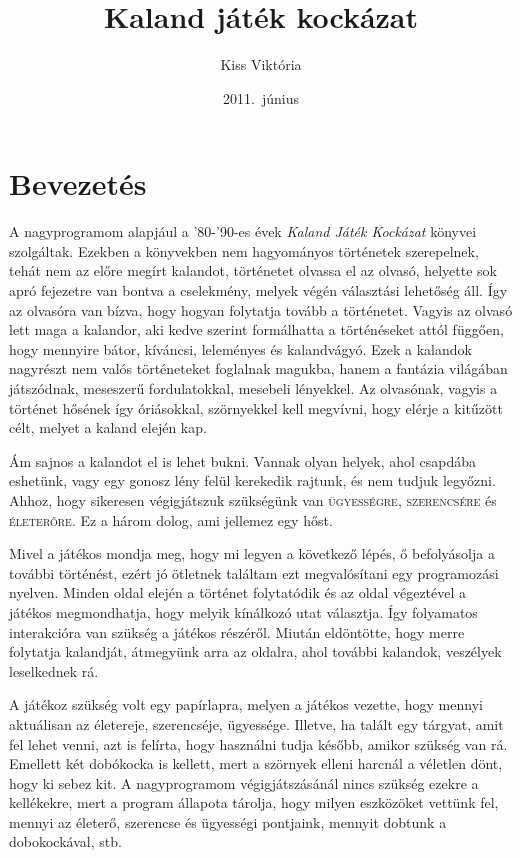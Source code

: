 \documentclass[12pt,a4paper,oneside]{report}
\begin{document}
\title{Kaland játék kockázat}
\author{Kiss Viktória}
\date{2011.\ június}
\maketitle
\tableofcontents

\chapter*{Bevezetés}
  A nagyprogramom alapjául a '80-'90-es évek \emph{Kaland Játék Kockázat}
  könyvei szolgáltak. Ezekben a könyvekben nem hagyományos történetek
  szerepelnek, tehát nem az előre megírt kalandot, történetet olvassa el
  az olvasó, helyette sok apró fejezetre van bontva a cselekmény, melyek
  végén választási lehetőség áll. Így az olvasóra van bízva, hogy hogyan
  folytatja tovább a történetet. Vagyis az olvasó lett maga a kalandor,
  aki kedve szerint formálhatta a történéseket attól függően, hogy
  mennyire bátor, kíváncsi, leleményes és kalandvágyó. Ezek a kalandok
  nagyrészt nem valós történeteket foglalnak magukba, hanem a fantázia
  világában játszódnak, meseszerű fordulatokkal, mesebeli lényekkel. Az
  olvasónak, vagyis a történet hősének így óriásokkal, szörnyekkel kell
  megvívni, hogy elérje a kitűzött célt, melyet a kaland elején kap.
  
  Ám sajnos a kalandot el is lehet bukni. Vannak olyan helyek, ahol
  csapdába eshetünk, vagy egy gonosz lény felül kerekedik rajtunk, és
  nem tudjuk legyőzni. Ahhoz, hogy sikeresen végigjátszuk szükségünk
  van \textsc{ügyességre}, \textsc{szerencsére} és
  \textsc{életerőre}. Ez a három dolog, ami jellemez egy hőst.

  Mivel a játékos mondja meg, hogy mi legyen a következő lépés, ő
  befolyásolja a további történést, ezért jó ötletnek találtam ezt
  megvalósítani egy programozási nyelven. Minden oldal elején a történet
  folytatódik és az oldal végeztével a játékos megmondhatja, hogy
  melyik kínálkozó utat választja. Így folyamatos interakcióra van
  szükség a játékos részéről. Miután eldöntötte, hogy merre folytatja
  kalandját, átmegyünk arra az oldalra, ahol további kalandok, veszélyek
  leselkednek rá.
  
  A játékoz szükség volt egy papírlapra, melyen a játékos vezette, hogy
  mennyi aktuálisan az életereje, szerencséje, ügyessége. Illetve, ha
  talált egy tárgyat, amit fel lehet venni, azt is felírta, hogy
  használni tudja később, amikor szükség van rá. Emellett két dobókocka
  is kellett, mert a szörnyek elleni harcnál a véletlen dönt, hogy ki
  sebez kit. A nagyprogramom végigjátszásánál nincs szükség ezekre a
  kellékekre, mert a program állapota tárolja, hogy milyen eszközöket vettünk
  fel, mennyi az életerő, szerencse és ügyességi pontjaink, mennyit
  dobtunk a dobokockával, stb.
  
\end{document}
